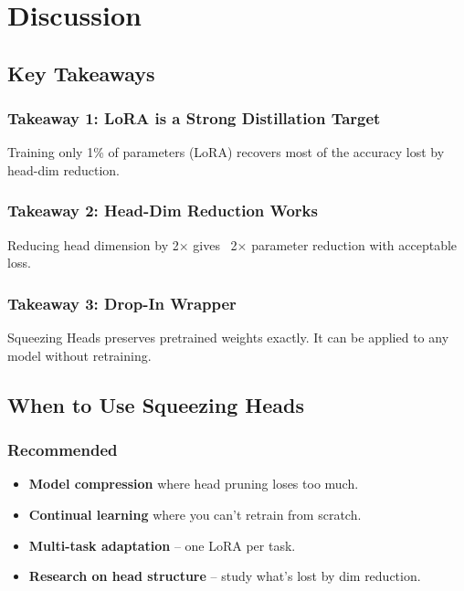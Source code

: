 
\section{Discussion}

\subsection{Key Takeaways}

\subsubsection{Takeaway 1: LoRA is a Strong Distillation Target}

Training only 1\% of parameters (LoRA) recovers most of the accuracy lost 
by head-dim reduction.

\subsubsection{Takeaway 2: Head-Dim Reduction Works}

Reducing head dimension by 2$\times$ gives ~2$\times$ parameter 
reduction with acceptable loss.

\subsubsection{Takeaway 3: Drop-In Wrapper}

Squeezing Heads preserves pretrained weights exactly. It can be applied 
to any model without retraining.

\subsection{When to Use Squeezing Heads}

\subsubsection{Recommended}

\begin{itemize}
\item \textbf{Model compression} where head pruning loses too much.
\item \textbf{Continual learning} where you can't retrain from scratch.
\item \textbf{Multi-task adaptation} -- one LoRA per task.
\item \textbf{Research on head structure} -- study what's lost by dim reduction.

\end{itemize}
